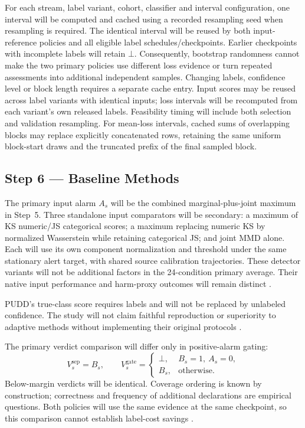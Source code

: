\documentclass[11pt,a4paper]{article}
\begin{document}
For each stream, label variant, cohort, classifier and interval configuration,
one interval will be computed and cached using a recorded resampling seed
when resampling is required. The identical interval will be reused by both
input-reference policies and all eligible label schedules/checkpoints. Earlier
checkpoints with incomplete labels will retain $\bot$. Consequently,
bootstrap randomness cannot make the two primary policies use different loss
evidence or turn repeated assessments into additional independent samples.
Changing labels, confidence level or block length requires a separate cache
entry. Input scores may be reused across label variants with identical inputs;
loss intervals will be recomputed from each variant's own released labels.
Feasibility timing will include both selection and validation resampling.
For mean-loss intervals, cached sums of overlapping blocks may replace
explicitly concatenated rows, retaining the same uniform block-start draws
and the truncated prefix of the final sampled block.

\subsection*{Step 6 --- Baseline Methods}
The primary input alarm $A_s$ will be the combined marginal-plus-joint maximum
in Step~5. Three standalone input comparators will be secondary: a maximum of
KS numeric/JS categorical scores; a maximum replacing numeric KS by normalized
Wasserstein while retaining categorical JS; and joint MMD alone. Each will use
its own component normalization and threshold under the same stationary alert
target, with shared source calibration trajectories. These detector variants
will not be additional factors in the 24-condition primary average. Their
native input performance and harm-proxy outcomes will remain distinct
\cite{cerqueira,greco}.

PUDD's true-class score requires labels and will not be replaced by unlabeled
confidence. The study will not claim faithful reproduction or superiority to
adaptive methods without implementing their original protocols
\cite{pudd,cerqueira,greco}.

The primary verdict comparison will differ only in positive-alarm gating:
\begin{equation}
V_s^{\mathrm{sep}}=B_s,\qquad V_s^{\mathrm{gate}}=
\begin{cases}\bot,&B_s=1,\ A_s=0,\\B_s,&\text{otherwise}.\end{cases}
\end{equation}
Below-margin verdicts will be identical. Coverage ordering is known by
construction; correctness and frequency of additional declarations are empirical
questions. Both policies will use the same evidence at the same checkpoint,
so this comparison cannot establish label-cost savings \cite{selective,alencar}.
\end{document}
